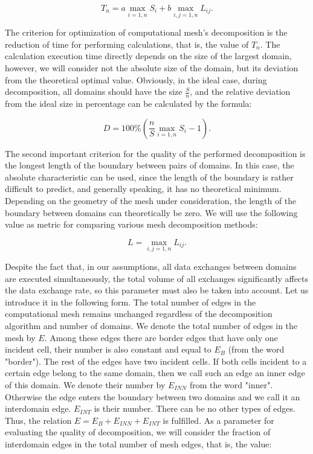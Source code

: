\documentclass[
11pt,%
tightenlines,%
twoside,%
onecolumn,%
nofloats,%
nobibnotes,%
nofootinbib,%
superscriptaddress,%
noshowpacs,%
centertags]%
{revtex4}
\begin{document}
\begin{equation}
T_n = a \max_{i = 1,n}{S_i} + b \max_{i,j=1,n}{L_{ij}}.
\end{equation}

The criterion for optimization of computational mesh's decomposition is the reduction of time for performing calculations, that is, the value of $ T_n $.
The calculation execution time directly depends on the size of the largest domain, however, we will consider not the absolute size of the domain, but its deviation from the theoretical optimal value.
Obviously, in the ideal case, during decomposition, all domains should have the size $ \frac{S}{n} $, and the relative deviation from the ideal size in percentage can be calculated by the formula:

\begin{equation}
D = 100 \% \left( \frac{n}{S} \max_{i=1,n}{S_i} - 1 \right).
\end{equation}

The second important criterion for the quality of the performed decomposition is the longest length of the boundary between pairs of domains.
In this case, the absolute characteristic can be used, since the length of the boundary is rather difficult to predict, and generally speaking, it has no theoretical minimum.
Depending on the geometry of the mesh under consideration, the length of the boundary between domains can theoretically be zero.
We will use the following value as metric for comparing various mesh decomposition methods:

\begin{equation}
L = \max_{i,j=1,n}{L_{ij}}.
\end{equation}

Despite the fact that, in our assumptions, all data exchanges between domains are executed simultaneously, the total volume of all exchanges significantly affects the data exchange rate, so this parameter must also be taken into account.
Let us introduce it in the following form.
The total number of edges in the computational mesh remains unchanged regardless of the decomposition algorithm and number of domains.
We denote the total number of edges in the mesh by $ E $.
Among these edges there are border edges that have only one incident cell, their number is also constant and equal to $ E_B $ (from the word "border").
The rest of the edges have two incident cells.
If both cells incident to a certain edge belong to the same domain, then we call such an edge an inner edge of this domain.
We denote their number by $ E_{INN} $ from the word "inner".
Otherwise the edge enters the boundary between two domains and we call it an interdomain edge.
$ E_{INT} $ is their number.
There can be no other types of edges.
Thus, the relation $ E = E_B + E_{INN} + E_{INT} $ is fulfilled.
As a parameter for evaluating the quality of decomposition, we will consider the fraction of interdomain edges in the total number of mesh edges, that is, the value:
\end{document}
